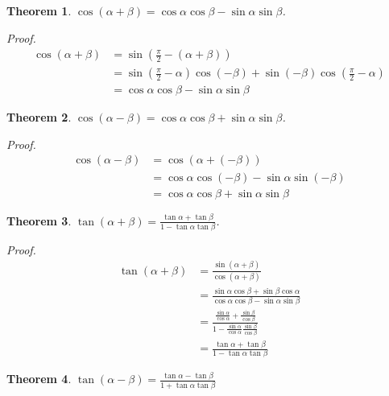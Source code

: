\documentclass[12pt]{article}
\newtheorem*{theorem}{Theorem}
\renewenvironment{proof}[1][Proof]{\begin{snugshade*} \textit{{#1}.}\\}{\hfill \qedsymbol \end{snugshade*}}
\begin{document}
    \begin{theorem}
        $\cos(\alpha+\beta)=\cos{\alpha}\cos{\beta}-\sin{\alpha}\sin{\beta}$.
    \end{theorem}

    \begin{proof}
        \begin{align*}
            \cos(\alpha+\beta)&=\sin(\frac{\pi}{2}-(\alpha+\beta))\\&=\sin(\frac{\pi}{2}-\alpha)\cos(-\beta)+\sin(-\beta)\cos(\frac{\pi}{2}-\alpha)\\&=\cos{\alpha}\cos{\beta}-\sin{\alpha}\sin{\beta}
        \end{align*}
    \end{proof}

    \begin{theorem}
        $\cos(\alpha-\beta)=\cos{\alpha}\cos{\beta}+\sin{\alpha}\sin{\beta}$.
    \end{theorem}

    \begin{proof}
        \begin{align*}
            \cos(\alpha-\beta)&=\cos(\alpha+(-\beta))\\&=\cos{\alpha}\cos(-\beta)-\sin{\alpha}\sin(-\beta)\\&=\cos{\alpha}\cos{\beta}+\sin{\alpha}\sin{\beta}
        \end{align*}
    \end{proof}

    \begin{theorem}
        $\tan(\alpha+\beta)=\frac{\tan{\alpha}+\tan{\beta}}{1-\tan{\alpha}\tan{\beta}}$.
    \end{theorem}

    \begin{proof}
        \begin{align*}
            \tan(\alpha+\beta)&=\frac{\sin(\alpha+\beta)}{\cos(\alpha+\beta)}\\&=\frac{\sin{\alpha}\cos{\beta}+\sin{\beta}\cos{\alpha}}{\cos{\alpha}\cos{\beta}-\sin{\alpha}\sin{\beta}}\\&=\frac{\frac{\sin{\alpha}}{\cos{\alpha}}+\frac{\sin{\beta}}{\cos{\beta}}}{1-\frac{\sin{\alpha}}{\cos{\alpha}}\frac{\sin{\beta}}{\cos{\beta}}}\\&=\frac{\tan{\alpha}+\tan{\beta}}{1-\tan{\alpha}\tan{\beta}}
        \end{align*}
    \end{proof}

    \begin{theorem}
        $\tan(\alpha-\beta)=\frac{\tan{\alpha}-\tan{\beta}}{1+\tan{\alpha}\tan{\beta}}$
    \end{theorem}
\end{document}

